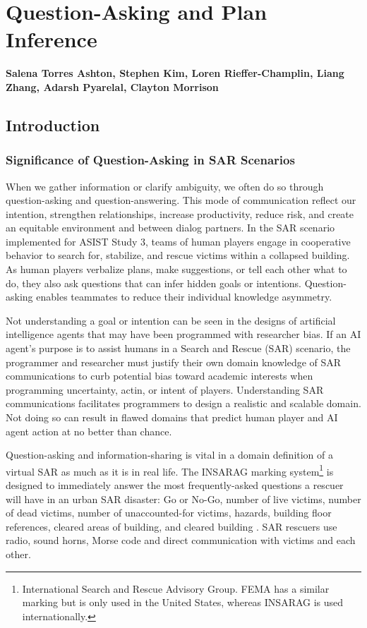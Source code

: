 \chapter{Question-Asking and Plan Inference}
\label{ch:question_plan}
\textbf{Salena Torres Ashton, Stephen Kim, Loren Rieffer-Champlin, Liang Zhang,
Adarsh Pyarelal, Clayton Morrison}

\section{Introduction}
\subsection{Significance of Question-Asking in SAR Scenarios}
When we gather information or clarify ambiguity, we often do so through question-asking and question-answering. This mode of communication reflect our intention, strengthen relationships, increase productivity, reduce risk, and create an equitable environment \citep{rothe_lake_gureckis_2018} and \citep{alaimi_2020} between dialog partners. In the SAR scenario implemented for ASIST Study 3, teams of human players engage in cooperative behavior to search for, stabilize, and rescue victims within a collapsed building. As human players verbalize plans, make suggestions, or tell each other what to do, they also ask questions that can infer hidden goals or intentions. Question-asking enables teammates to reduce their individual knowledge asymmetry.  

Not understanding a goal or intention can be seen in the designs of artificial intelligence agents that may have been programmed with researcher bias. If an AI agent's purpose is to assist humans in a Search and Rescue (SAR) scenario, the programmer and researcher must justify their own domain knowledge of SAR communications to curb potential bias toward academic interests when programming uncertainty, actin, or intent of players. Understanding SAR communications facilitates programmers to design a realistic and scalable domain. Not doing so can result in flawed domains that predict human player and AI agent action at no better than chance. 

Question-asking and information-sharing is vital in a domain definition of a virtual SAR as much as it is in real life. The INSARAG marking system\footnote{International Search and Rescue Advisory Group. FEMA has a similar marking but is only used in the United States, whereas INSARAG is used internationally.} is designed to immediately answer the most frequently-asked questions a rescuer will have in an urban SAR disaster: Go or No-Go, number of live victims, number of dead victims, number of unaccounted-for victims, hazards, building floor references, cleared areas of building, and cleared building \citep{insarag_2022}. SAR rescuers use radio, sound horns, Morse code and direct communication with victims and each other.

